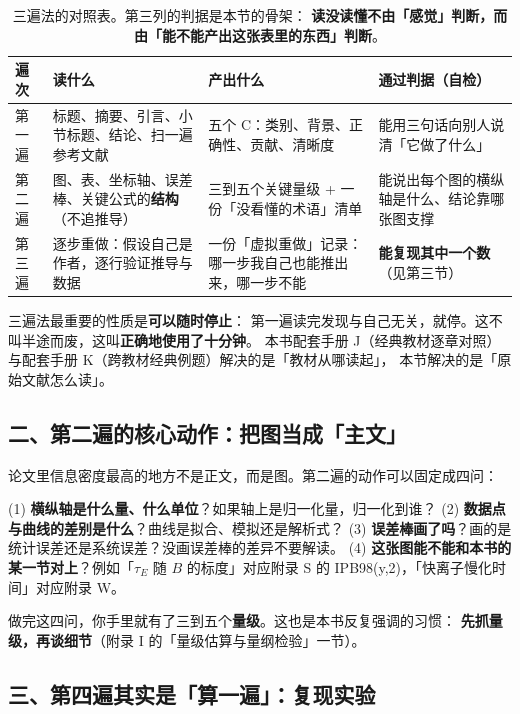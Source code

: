 \begin{table}[htbp]
\centering
\small
\caption{三遍法的对照表。第三列的判据是本节的骨架：
\textbf{读没读懂不由「感觉」判断，而由「能不能产出这张表里的东西」判断}。}
\label{tab:app-i-paperpass}
\begin{tabular}{p{1.5cm}p{4.6cm}p{4.6cm}p{4.5cm}}
\toprule
遍次 & 读什么 & 产出什么 & 通过判据（自检） \\
\midrule
第一遍 & 标题、摘要、引言、小节标题、结论、扫一遍参考文献 & 五个 C：类别、背景、正确性、贡献、清晰度 & 能用三句话向别人说清「它做了什么」 \\
第二遍 & 图、表、坐标轴、误差棒、关键公式的\textbf{结构}（不追推导） & 三到五个关键量级 + 一份「没看懂的术语」清单 & 能说出每个图的横纵轴是什么、结论靠哪张图支撑 \\
第三遍 & 逐步重做：假设自己是作者，逐行验证推导与数据 & 一份「虚拟重做」记录：哪一步我自己也能推出来，哪一步不能 & \textbf{能复现其中一个数}（见第三节） \\
\bottomrule
\end{tabular}

\end{table}

三遍法最重要的性质是\textbf{可以随时停止}：
第一遍读完发现与自己无关，就停。这不叫半途而废，这叫\textbf{正确地使用了十分钟}。
本书配套手册 J（经典教材逐章对照）与配套手册 K（跨教材经典例题）解决的是「教材从哪读起」，
本节解决的是「原始文献怎么读」。

\subsection*{二、第二遍的核心动作：把图当成「主文」}

论文里信息密度最高的地方不是正文，而是图。第二遍的动作可以固定成四问：

(1) \textbf{横纵轴是什么量、什么单位}？如果轴上是归一化量，归一化到谁？
(2) \textbf{数据点与曲线的差别是什么}？曲线是拟合、模拟还是解析式？
(3) \textbf{误差棒画了吗}？画的是统计误差还是系统误差？没画误差棒的差异不要解读。
(4) \textbf{这张图能不能和本书的某一节对上}？例如「$\tau_E$ 随 $B$ 的标度」对应附录 S
的 IPB98(y,2)，「快离子慢化时间」对应附录 W。

做完这四问，你手里就有了三到五个\textbf{量级}。这也是本书反复强调的习惯：
\textbf{先抓量级，再谈细节}（附录 I 的「量级估算与量纲检验」一节）。

\subsection*{三、第四遍其实是「算一遍」：复现实验}

